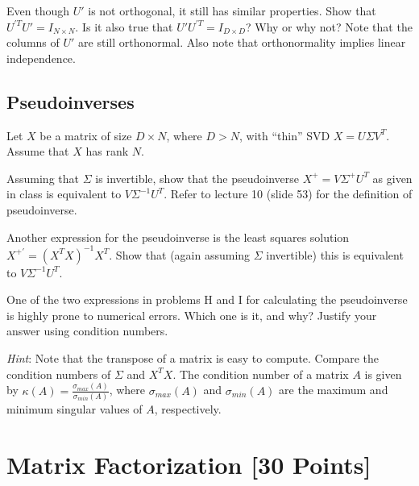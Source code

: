\problem[4] Even though $U'$ is not orthogonal, it still has similar properties. Show that $U^{'T} U' = I_{N \times N}$. Is it also true that $U' U^{'T} = I_{D \times D}$? Why or why not? Note that the columns of $U'$ are still orthonormal. Also note that orthonormality implies linear independence.

\begin{solution}
\end{solution}

\newpage
\subsection{Pseudoinverses} Let $X$ be a matrix of size $D \times N$, where $D > N$, with ``thin'' SVD $X = U\Sigma V^T$. Assume that $X$ has rank $N$.

\problem[4] Assuming that $\Sigma$ is invertible, show that the pseudoinverse $X^+ = V\Sigma^+ U^T$ as given in class is equivalent to $V\Sigma^{-1} U^T$. Refer to lecture 10 (slide 53) for the definition of pseudoinverse.

\begin{solution}
\end{solution}

\problem[4] Another expression for the pseudoinverse is the least squares solution $X^{+'} = (X^T X)^{-1}X^T$. Show that (again assuming $\Sigma$ invertible) this is equivalent to $V\Sigma^{-1}U^T$.
\begin{solution}
\end{solution}

\problem[2] One of the two expressions in problems H and I for calculating the pseudoinverse is highly prone to numerical errors. Which one is it, and why? Justify your answer using condition numbers.

\textit{Hint}: Note that the transpose of a matrix is easy to compute. Compare the condition numbers of $\Sigma$ and $X^T X$. The condition number of a matrix $A$ is given by $\kappa(A) = \frac{\sigma_{max}(A)}{\sigma_{min}(A)}$, where $\sigma_{max}(A)$ and $\sigma_{min}(A)$ are the maximum and minimum singular values of $A$, respectively.

\begin{solution}

\end{solution}


\newpage
\section{Matrix Factorization [30 Points]}

